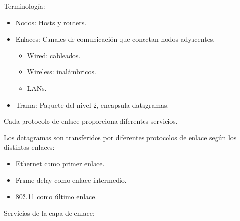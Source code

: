 \documentclass[12pt, twoside, openright]{report} %
\begin{document}
    Terminología:

    \begin{itemize}
    \item
      Nodos: Hosts y routers.
    \item
      Enlaces: Canales de comunicación que conectan nodos adyacentes.

      \begin{itemize}
      \item
        Wired: cableados.
      \item
        Wireless: inalámbricos.
      \item
        LANs.
      \end{itemize}
    \item
      Trama: Paquete del nivel 2, encapsula datagramas.
    \end{itemize}

    Cada protocolo de enlace proporciona diferentes servicios.

    Los datagramas son transferidos por diferentes protocolos de enlace
    según los distintos enlaces:

    \begin{itemize}
    \item
      Ethernet como primer enlace.
    \item
      Frame delay como enlace intermedio.
    \item
      802.11 como último enlace.
    \end{itemize}

    Servicios de la capa de enlace:
\end{document}
